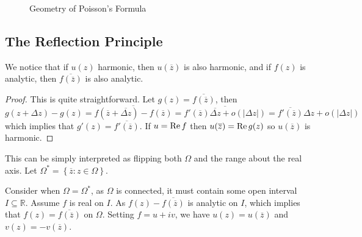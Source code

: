 \documentclass[../main.tex]{subfiles}
\begin{document}
\begin{figure}[ht]
    \centering
    \caption{Geometry of Poisson's Formula}
    \label{fig:geometry-of-poisson's-formula}
\end{figure}

\subsection{The Reflection Principle}

We notice that if $u(z)$ harmonic, then $u(\overline{z})$ is also harmonic, and if $f(z)$ is analytic, then $\overline{f(\overline{z})}$ is also analytic.
\begin{proof}
	This is quite straightforward. Let $g(z) = \overline{f(\overline{z})}$, then
	\begin{equation*}
		g(z+\Delta z) - g(z) = \overline{f(\overline{z}+\overline{\Delta z}) - f(\overline{z})} = \overline{f'(\overline{z}) \overline{\Delta z} + o(\left|\Delta z\right|)} = \overline{f'(\overline{z})} \Delta z + o(\left|\Delta z\right|)
	\end{equation*}
	which implies that $g'(z) = \overline{f'(\overline{z})}$. If $u=\operatorname{Re} f$ then $u(\overline{z}) = \operatorname{Re} g(z)$ so $u(\overline{z})$ is harmonic.
\end{proof}
This can be simply interpreted as flipping both $\Omega$ and the range about the real axis. Let $\Omega^* = \left\{ \overline{z} : z\in \Omega \right\}$.

Consider when $\Omega = \Omega^*$, as $\Omega$ is connected, it must contain some open interval $I \subseteq \mathbb{R}$. Assume $f$ is real on $I$. As $f(z) - \overline{f(\overline{z})}$ is analytic on $I$, which implies that $f(z) = \overline{f(\overline{z})}$ on $\Omega$. Setting $f=u+iv$, we have $u(z) = u(\overline{z})$ and $v(z) = -v(\overline{z})$.
\end{document}
